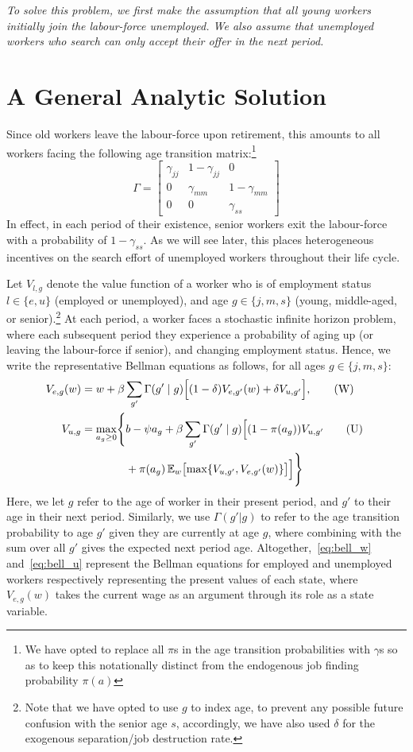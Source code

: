\documentclass{article}
\begin{document}
\textit{To solve this problem, we first make the assumption that all young workers initially join the labour-force unemployed. We also assume that unemployed workers who search can only accept their offer in the next period.}

\section{A General Analytic Solution}
\smallskip
Since old workers leave the labour-force upon retirement, this amounts to all workers facing the following age transition matrix:\footnote{We have opted to replace all $\pi$s in the age transition probabilities with $\gamma$s so as to keep this notationally distinct from the endogenous job finding probability $\pi(a)$}
\[
\Gamma = \begin{bmatrix}
    \gamma_{jj} & 1-\gamma_{jj} & 0 \\
    0 & \gamma_{mm} & 1-\gamma_{mm} \\
    0 & 0 & \gamma_{ss}
\end{bmatrix}
\]
In effect, in each period of their existence, senior workers exit the labour-force with a probability of $1-\gamma_{ss}$. As we will see later, this places heterogeneous incentives on the search effort of unemployed workers throughout their life cycle.

Let $V_{l,g}$ denote the value function of a worker who is of employment status $l\in\{e,u\}$ (employed or unemployed), and age $g\in\{j,m,s\}$ (young, middle-aged, or senior).\footnote{Note that we have opted to use $g$ to index age, to prevent any possible future confusion with the senior age $s$, accordingly, we have also used $\delta$ for the exogenous separation/job destruction rate.} At each period, a worker faces a stochastic infinite horizon problem, where each subsequent period they experience a probability of aging up (or leaving the labour-force if senior), and changing employment status. Hence, we write the representative Bellman equations as follows, for all ages $g\in\{j,m,s\}$:
\begin{align}
V_{e,g}(w)
&=
w+\beta\sum_{g'}\Gamma(g'\mid g)
\Bigl[
(1-\delta)V_{e,g'}(w)+\delta V_{u,g'}
\Bigr],
\tag{W}\label{eq:bell_w}
\\
V_{u,g}
&= \max_{a_g \ge 0} \Biggl\{
b - \psi a_g + \beta \sum_{g'} \Gamma(g' \mid g)
\Bigl[
(1 - \pi(a_g)) V_{u,g'} \tag{U}~\label{eq:bell_u}\\
&\qquad\qquad + \pi(a_g)\, \mathbb{E}_w \bigl[\max\{V_{u,g'}, V_{e,g'}(w)\}\bigr]
\Bigr]
\Biggr\} \notag
\end{align}
Here, we let $g$ refer to the age of worker in their present period, and $g'$ to their age in their next period. Similarly, we use $\Gamma(g'|g)$ to refer to the age transition probability to age $g'$ given they are currently at age $g$, where combining with the sum over all $g'$ gives the expected next period age. Altogether,~\eqref{eq:bell_w} and~\eqref{eq:bell_u} represent the Bellman equations for employed and unemployed workers respectively representing the present values of each state, where $V_{e,g}(w)$ takes the current wage as an argument through its role as a state variable.
\end{document}
